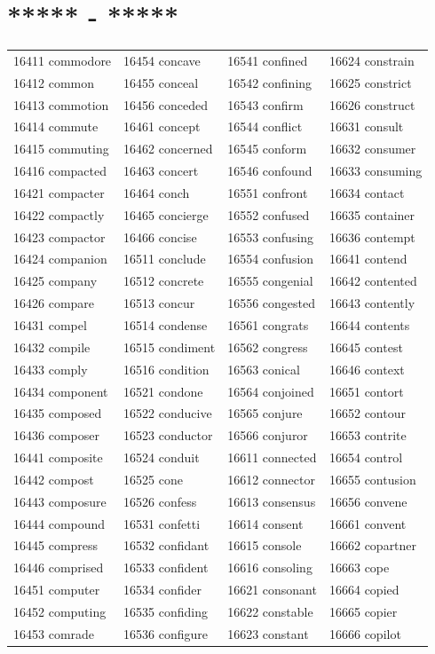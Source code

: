 \documentclass[10pt, oneside]{book}
\begin{document}
\begin{table}
	\centering
	\section*{***** - *****}
	\begin{tabular}{l l l l}
16411 commodore &16454 concave &16541 confined &16624 constrain\\
16412 common &16455 conceal &16542 confining &16625 constrict\\
16413 commotion &16456 conceded &16543 confirm &16626 construct\\
16414 commute &16461 concept &16544 conflict &16631 consult\\
16415 commuting &16462 concerned &16545 conform &16632 consumer\\
16416 compacted &16463 concert &16546 confound &16633 consuming\\
16421 compacter &16464 conch &16551 confront &16634 contact\\
16422 compactly &16465 concierge &16552 confused &16635 container\\
16423 compactor &16466 concise &16553 confusing &16636 contempt\\
16424 companion &16511 conclude &16554 confusion &16641 contend\\
16425 company &16512 concrete &16555 congenial &16642 contented\\
16426 compare &16513 concur &16556 congested &16643 contently\\
16431 compel &16514 condense &16561 congrats &16644 contents\\
16432 compile &16515 condiment &16562 congress &16645 contest\\
16433 comply &16516 condition &16563 conical &16646 context\\
16434 component &16521 condone &16564 conjoined &16651 contort\\
16435 composed &16522 conducive &16565 conjure &16652 contour\\
16436 composer &16523 conductor &16566 conjuror &16653 contrite\\
16441 composite &16524 conduit &16611 connected &16654 control\\
16442 compost &16525 cone &16612 connector &16655 contusion\\
16443 composure &16526 confess &16613 consensus &16656 convene\\
16444 compound &16531 confetti &16614 consent &16661 convent\\
16445 compress &16532 confidant &16615 console &16662 copartner\\
16446 comprised &16533 confident &16616 consoling &16663 cope\\
16451 computer &16534 confider &16621 consonant &16664 copied\\
16452 computing &16535 confiding &16622 constable &16665 copier\\
16453 comrade &16536 configure &16623 constant &16666 copilot\\
	\end{tabular}
 \end{table}
\end{document}
